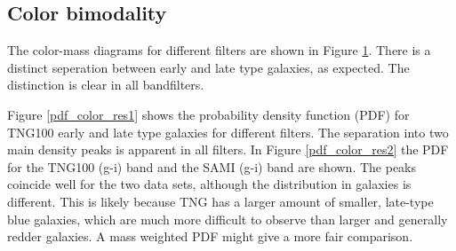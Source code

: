 \subsection{Color bimodality}
The color-mass diagrams for different filters are shown in Figure \ref{color_magnitude_res}. There is a distinct seperation between early and late type galaxies, as expected. The distinction is clear in all bandfilters. 

Figure \ref{pdf_color_res1} shows the probability density function (PDF) for TNG100 early and late type galaxies for different filters. The separation into two main density peaks is apparent in all filters. In Figure \ref{pdf_color_res2} the PDF for the TNG100 (g-i) band and the SAMI (g-i) band are shown. The peaks coincide well for the two data sets, although the distribution in galaxies is different. This is likely because TNG has a larger amount of smaller, late-type blue galaxies, which are much more difficult to observe than larger and generally redder galaxies. A mass weighted PDF might give a more fair comparison.

\begin{figure}
    \centering
    \caption{}
    \label{color_magnitude_res}
\end{figure}

